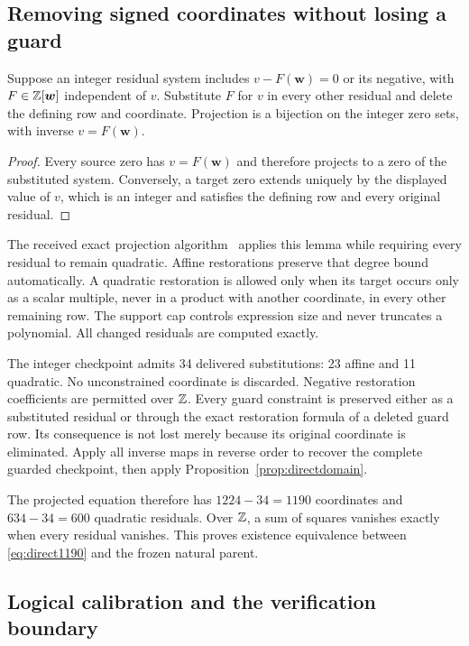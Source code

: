 \subsection{Removing signed coordinates without losing a guard}

\begin{lemma}\label{lem:directprojection}
Suppose an integer residual system includes $v-F(\boldsymbol w)=0$
or its negative, with $F\in\mathbb Z[\boldsymbol w]$ independent of $v$.
Substitute $F$ for $v$ in every other residual and delete the defining
row and coordinate. Projection is a bijection on the integer zero sets,
with inverse $v=F(\boldsymbol w)$.
\end{lemma}
\begin{proof}
Every source zero has $v=F(\boldsymbol w)$ and therefore projects to a
zero of the substituted system. Conversely, a target zero extends
uniquely by the displayed value of $v$, which is an integer and satisfies
the defining row and every original residual.
\end{proof}

The received exact projection algorithm~\cite{batched} applies this
lemma while requiring every residual to remain quadratic. Affine
restorations preserve that degree bound automatically. A quadratic
restoration is allowed only when its target occurs only as a scalar
multiple, never in a product with another coordinate, in every other
remaining row. The support cap controls expression size and never
truncates a polynomial. All changed residuals are computed exactly.

The integer checkpoint admits 34 delivered substitutions: 23 affine
and 11 quadratic. No unconstrained coordinate is discarded. Negative
restoration coefficients are permitted over $\mathbb Z$. Every guard constraint
is preserved either as a substituted residual or through the exact
restoration formula of a deleted guard row. Its consequence is not lost
merely because its original coordinate is eliminated. Apply all inverse
maps in reverse order to recover the complete guarded checkpoint, then
apply Proposition~\ref{prop:directdomain}.

The projected equation therefore has $1224-34=1190$ coordinates and
$634-34=600$ quadratic residuals. Over $\mathbb Z$, a sum of squares vanishes
exactly when every residual vanishes. This proves existence equivalence
between \eqref{eq:direct1190} and the frozen natural parent.

\subsection{Logical calibration and the verification boundary}

